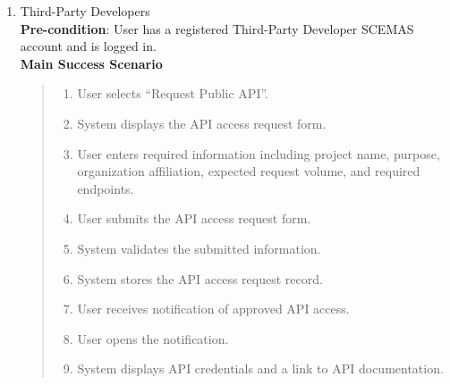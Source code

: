 \documentclass[]{article}
\begin{document}
\begin{enumerate}[{\bf BE7.}]
\begin{enumerate}[{\bf VP1.}]
            \item Third-Party Developers \\
                \textbf{Pre-condition}: User has a registered Third-Party Developer SCEMAS account and is logged in.\\
                \textbf{Main Success Scenario}
                \begin{quote}
                    \begin{enumerate}[1.]
                        \item User selects ``Request Public API''.
                        \item System displays the API access request form.
                        \item User enters required information including project name, purpose, organization affiliation, expected request volume, and required endpoints.
                        \item User submits the API access request form.
                        \item System validates the submitted information.
                        \item System stores the API access request record.
                        \item User receives notification of approved API access.
                        \item User opens the notification.
                        \item System displays API credentials and a link to API documentation.
                    \end{enumerate}
                \end{quote}


\end{enumerate}
\end{enumerate}
\end{document}
